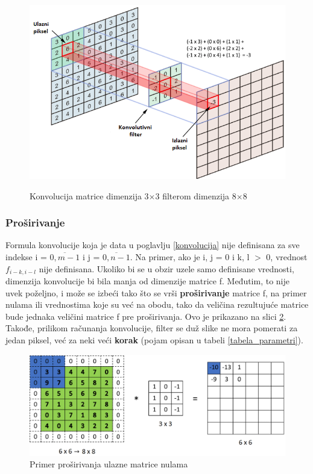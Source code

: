 \documentclass[a4paper]{article}
\begin{document}
\begin{figure}[h!]
\caption{Konvolucija matrice dimenzija 3$\times$3 filterom dimenzija 8$\times$8}
\centering
\includegraphics[scale=0.9]{convolution.png}
\label{fig:convolution}
\end{figure}

\subsubsection{Proširivanje}
\label{prosirivanje}

Formula konvolucije koja je data u poglavlju \ref{konvolucija} nije definisana za sve indekse i = $\overline{0, m-1}$ i j = $\overline{0, n-1}$. Na primer, ako je i, j = 0 i k, l $>$ 0, vrednost $f_{i-k, i-l}$ nije definisana. Ukoliko bi se u obzir uzele samo definisane vrednosti, dimenzija konvolucije bi bila manja od dimenzije matrice f. Međutim, to nije uvek poželjno, i može se izbeći tako što se vrši \textbf{proširivanje} matrice f, na primer nulama ili vrednostima koje su već na obodu, tako da veličina rezultujuće matrice bude jednaka veličini matrice f pre proširivanja. Ovo je prikazano na slici \ref{fig:padding}. Takođe, prilikom računanja konvolucije, filter se duž slike ne mora pomerati za jedan piksel, već za neki veći \textbf{korak} (pojam opisan u tabeli \ref{tabela_parametri}).

\begin{figure}[h!]
\begin{center}
\includegraphics[scale=0.38]{padding.png}
\end{center}
\caption{Primer proširivanja ulazne matrice nulama}
\label{fig:padding}
\end{figure}
\end{document}
